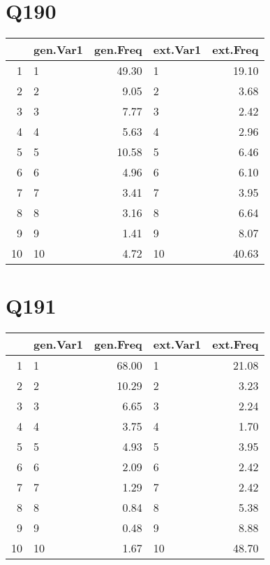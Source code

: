 \documentclass{amsart}
\begin{document}
\section{Q190}
\begin{table}[ht]
\centering
\begin{tabular}{rlrlr}
  \hline
 & gen.Var1 & gen.Freq & ext.Var1 & ext.Freq \\ 
  \hline
1 & 1 & 49.30 & 1 & 19.10 \\ 
  2 & 2 & 9.05 & 2 & 3.68 \\ 
  3 & 3 & 7.77 & 3 & 2.42 \\ 
  4 & 4 & 5.63 & 4 & 2.96 \\ 
  5 & 5 & 10.58 & 5 & 6.46 \\ 
  6 & 6 & 4.96 & 6 & 6.10 \\ 
  7 & 7 & 3.41 & 7 & 3.95 \\ 
  8 & 8 & 3.16 & 8 & 6.64 \\ 
  9 & 9 & 1.41 & 9 & 8.07 \\ 
  10 & 10 & 4.72 & 10 & 40.63 \\ 
   \hline
\end{tabular}
\end{table}

\section{Q191}
\begin{table}[ht]
\centering
\begin{tabular}{rlrlr}
  \hline
 & gen.Var1 & gen.Freq & ext.Var1 & ext.Freq \\ 
  \hline
1 & 1 & 68.00 & 1 & 21.08 \\ 
  2 & 2 & 10.29 & 2 & 3.23 \\ 
  3 & 3 & 6.65 & 3 & 2.24 \\ 
  4 & 4 & 3.75 & 4 & 1.70 \\ 
  5 & 5 & 4.93 & 5 & 3.95 \\ 
  6 & 6 & 2.09 & 6 & 2.42 \\ 
  7 & 7 & 1.29 & 7 & 2.42 \\ 
  8 & 8 & 0.84 & 8 & 5.38 \\ 
  9 & 9 & 0.48 & 9 & 8.88 \\ 
  10 & 10 & 1.67 & 10 & 48.70 \\ 
   \hline
\end{tabular}
\end{table}
\end{document}
